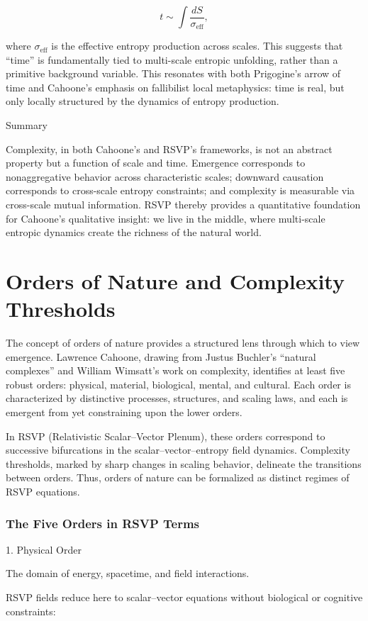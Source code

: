 \documentclass[12pt]{book}
\begin{document}
\[ t \sim \int \frac{dS}{\sigma_{\text{eff}}}, \]

where \( \sigma_{\text{eff}} \) is the effective entropy production across scales. This suggests that “time” is fundamentally tied to multi-scale entropic unfolding, rather than a primitive background variable. This resonates with both Prigogine’s arrow of time and Cahoone’s emphasis on fallibilist local metaphysics: time is real, but only locally structured by the dynamics of entropy production.

Summary

Complexity, in both Cahoone’s and RSVP’s frameworks, is not an abstract property but a function of scale and time. Emergence corresponds to nonaggregative behavior across characteristic scales; downward causation corresponds to cross-scale entropy constraints; and complexity is measurable via cross-scale mutual information. RSVP thereby provides a quantitative foundation for Cahoone’s qualitative insight: we live in the middle, where multi-scale entropic dynamics create the richness of the natural world.

\chapter{Orders of Nature and Complexity Thresholds}
The concept of orders of nature provides a structured lens through which to view emergence. Lawrence Cahoone, drawing from Justus Buchler’s “natural complexes” and William Wimsatt’s work on complexity, identifies at least five robust orders: physical, material, biological, mental, and cultural. Each order is characterized by distinctive processes, structures, and scaling laws, and each is emergent from yet constraining upon the lower orders.

In RSVP (Relativistic Scalar–Vector Plenum), these orders correspond to successive bifurcations in the scalar–vector–entropy field dynamics. Complexity thresholds, marked by sharp changes in scaling behavior, delineate the transitions between orders. Thus, orders of nature can be formalized as distinct regimes of RSVP equations.

\subsection{The Five Orders in RSVP Terms}
1. Physical Order

The domain of energy, spacetime, and field interactions.

RSVP fields reduce here to scalar–vector equations without biological or cognitive constraints:
\end{document}
